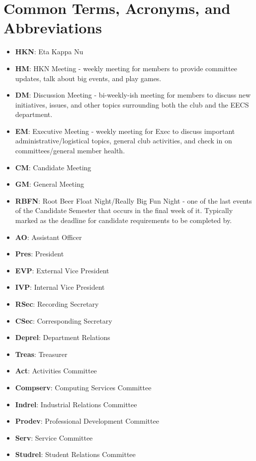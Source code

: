 \documentclass[11pt, article, oneside]{memoir}
\begin{document}
    \chapter{Common Terms, Acronyms, and Abbreviations}
    \begin{itemize}
        \item \textbf{HKN}: Eta Kappa Nu
        \item \textbf{HM}: HKN Meeting - weekly meeting for members to provide committee updates, talk about big events, and play games.
        \item \textbf{DM}: Discussion Meeting - bi-weekly-ish meeting for members to discuss new initiatives, issues, and other topics surrounding both the club and the EECS department.
        \item \textbf{EM}: Executive Meeting - weekly meeting for Exec to discuss important administrative/logistical topics, general club activities, and check in on committees/general member health.
        \item \textbf{CM}: Candidate Meeting
        \item \textbf{GM}: General Meeting
        \item \textbf{RBFN}: Root Beer Float Night/Really Big Fun Night - one of the last events of the Candidate Semester that occurs in the final week of it. Typically marked as the deadline for candidate requirements to be completed by.
        \item \textbf{AO}: Assistant Officer
        \item \textbf{Pres}: President
        \item \textbf{EVP}: External Vice President
        \item \textbf{IVP}: Internal Vice President
        \item \textbf{RSec}: Recording Secretary
        \item \textbf{CSec}: Corresponding Secretary
        \item \textbf{Deprel}: Department Relations
        \item \textbf{Treas}: Treasurer
        \item \textbf{Act}: Activities Committee
        \item \textbf{Compserv}: Computing Services Committee
        \item \textbf{Indrel}: Industrial Relations Committee
        \item \textbf{Prodev}: Professional Development Committee
        \item \textbf{Serv}: Service Committee
        \item \textbf{Studrel}: Student Relations Committee
    \end{itemize}
    
\end{document}
